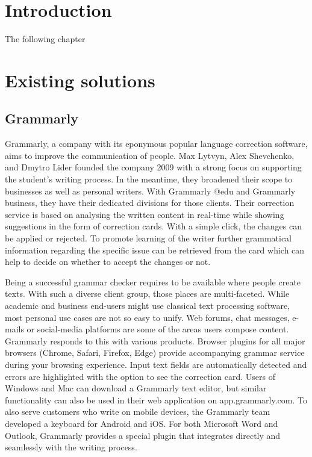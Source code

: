 \documentclass[runningheads]{llncs}
\begin{document}
\section{Introduction}\label{sec:outl}
The following chapter 

\newpage


\section{Existing solutions}
\subsection{Grammarly}
Grammarly, a company with its eponymous popular language correction software, aims to improve the communication of people. Max Lytvyn, Alex Shevchenko, and Dmytro Lider founded the company 2009 with a strong focus on supporting the student's writing process. In the meantime, they broadened their scope to businesses as well as personal writers. With Grammarly @edu and Grammarly business, they have their dedicated divisions for those clients. Their correction service is based on analysing the written content in real-time while showing suggestions in the form of correction cards.  With a simple click, the changes can be applied or rejected. To promote learning of the writer further grammatical information regarding the specific issue can be retrieved from the card which can help to decide on whether to accept the changes or not. \citep{noauthor_write_nodate}

Being a successful grammar checker requires to be available where people create texts. With such a diverse client group, those places are multi-faceted. While academic and business end-users might use classical text processing software, most personal use cases are not so easy to unify. Web forums, chat messages, e-mails or social-media platforms are some of the areas users compose content. Grammarly responds to this with various products. Browser plugins for all major browsers (Chrome, Safari, Firefox, Edge) provide accompanying grammar service during your browsing experience. Input text fields are automatically detected and errors are highlighted with the option to see the correction card. Users of Windows and Mac can download a Grammarly text editor, but similar functionality can also be used in their web application on app.grammarly.com. To also serve customers who write on mobile devices, the Grammarly team developed a keyboard for Android and iOS. For both Microsoft Word and Outlook, Grammarly provides a special plugin that integrates directly and seamlessly with the writing process.
\end{document}
